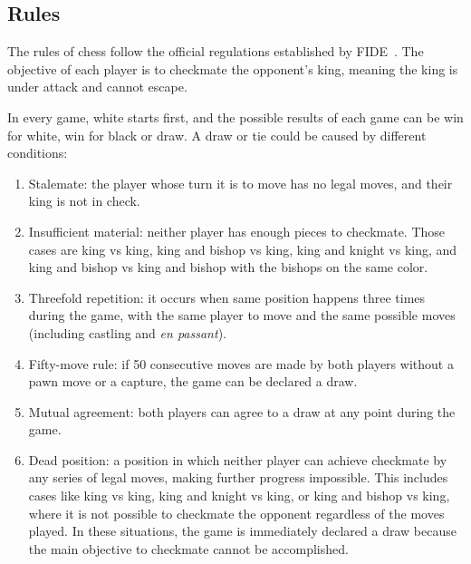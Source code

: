\subsection{Rules}
\label{sec:rules}

The rules of chess follow the official regulations established by FIDE~\cite{LawsOfChess}. The objective of each player is to checkmate the opponent's king, meaning the king is under attack and cannot escape.

\vspace{1em}

\noindent In every game, white starts first, and the possible results of each game can be win for white, win for black or draw. A draw or tie could be caused by different conditions:

\begin{enumerate}
    \item Stalemate: the player whose turn it is to move has no legal moves, and their king is not in check.
    \item Insufficient material: neither player has enough pieces to checkmate. Those cases are king vs king, king and bishop vs king, king and knight vs king, and king and bishop vs king and bishop with the bishops on the same color.
    \item Threefold repetition: it occurs when same position happens three times during the game, with the same player to move and the same possible moves (including castling and \textit{en passant}).
    \item Fifty-move rule: if 50 consecutive moves are made by both players without a pawn move or a capture, the game can be declared a draw. \label{itm:fifty-move-rule}
    \item Mutual agreement: both players can agree to a draw at any point during the game.
    \item Dead position: a position in which neither player can achieve checkmate by any series of legal moves, making further progress impossible. This includes cases like king vs king, king and knight vs king, or king and bishop vs king, where it is not possible to checkmate the opponent regardless of the moves played. In these situations, the game is immediately declared a draw because the main objective to checkmate cannot be accomplished.
\end{enumerate}

